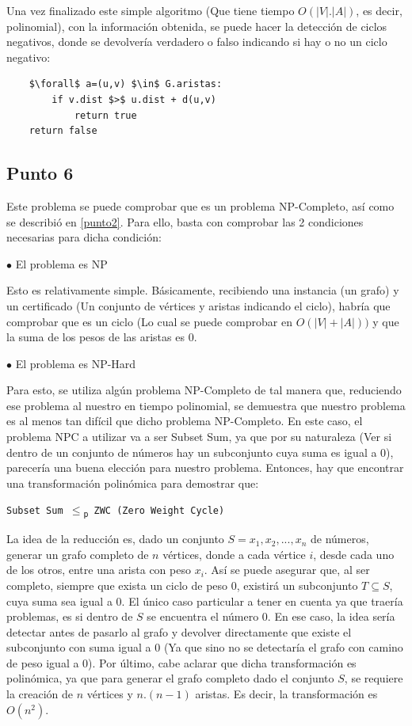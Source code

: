 \documentclass[a4paper,10pt]{article}
\begin{document}
	Una vez finalizado este simple algoritmo (Que tiene tiempo $O(|V|.|A|)$, es decir, polinomial), con la información obtenida, se puede hacer la detección de ciclos negativos, donde se devolvería verdadero o falso indicando si hay o no un ciclo negativo:
	\begin{lstlisting}
	$\forall$ a=(u,v) $\in$ G.aristas:
	    if v.dist $>$ u.dist + d(u,v)
	        return true
	return false
	\end{lstlisting}

\subsection{Punto 6}
	Este problema se puede comprobar que es un problema NP-Completo, así como se describió en \ref{punto2}. Para ello, basta con comprobar las 2 condiciones necesarias para dicha condición:

	$\bullet$ El problema es NP

	Esto es relativamente simple. Básicamente, recibiendo una instancia (un grafo) y un certificado (Un conjunto de vértices y aristas indicando el ciclo), habría que comprobar que es un ciclo (Lo cual se puede comprobar en $O(|V|+|A|))$ y que la suma de los pesos de las aristas es 0.

	$\bullet$ El problema es NP-Hard

	Para esto, se utiliza algún problema NP-Completo de tal manera que, reduciendo ese problema al nuestro en tiempo polinomial, se demuestra que nuestro problema es al menos tan difícil que dicho problema NP-Completo. En este caso, el problema NPC a utilizar va a ser Subset Sum, ya que por su naturaleza (Ver si dentro de un conjunto de números hay un subconjunto cuya suma es igual a 0), parecería una buena elección para nuestro problema. Entonces, hay que encontrar una transformación polinómica para demostrar que:

	\texttt{Subset Sum $\leq$\textsubscript{p} ZWC (Zero Weight Cycle)}
	\linebreak

	La idea de la reducción es, dado un conjunto $S={x_1, x_2, ..., x_n}$ de números, generar un grafo completo de $n$ vértices, donde a cada vértice $i$, desde cada uno de los otros, entre una arista con peso $x_i$. Así se puede asegurar que, al ser completo, siempre que exista un ciclo de peso 0, existirá un subconjunto $T \subseteq S$, cuya suma sea igual a 0. El único caso particular a tener en cuenta ya que traería problemas, es si dentro de $S$ se encuentra el número 0. En ese caso, la idea sería detectar antes de pasarlo al grafo y devolver directamente que existe el subconjunto con suma igual a 0 (Ya que sino no se detectaría el grafo con camino de peso igual a 0). Por último, cabe aclarar que dicha transformación es polinómica, ya que para generar el grafo completo dado el conjunto $S$, se requiere la creación de $n$ vértices y $n.(n-1)$ aristas. Es decir, la transformación es $O(n^2)$.
\end{document}

